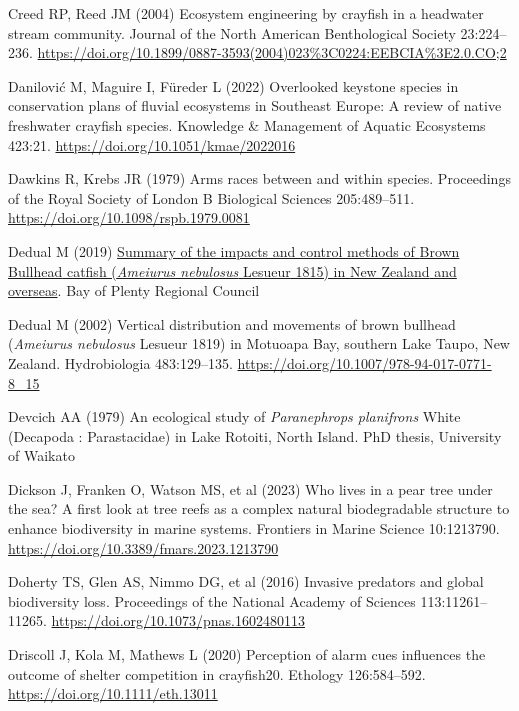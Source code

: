 \documentclass[
  12pt,
  a4paper,
  oneside]{scrbook}
\newlength{\cslhangindent}
\newenvironment{CSLReferences}[2] %
 {\begin{list}{}{%
  \setlength{\itemindent}{0pt}
  \setlength{\leftmargin}{0pt}
  \setlength{\parsep}{0pt}
  \ifodd #1
   \setlength{\leftmargin}{\cslhangindent}
   \setlength{\itemindent}{-1\cslhangindent}
  \fi
  \setlength{\itemsep}{#2\baselineskip}}}
 {\end{list}}
\begin{document}
\begin{CSLReferences}{1}{1}
Creed RP, Reed JM (2004) Ecosystem engineering by crayfish in a
headwater stream community. Journal of the North American Benthological
Society 23:224--236.
\url{https://doi.org/10.1899/0887-3593(2004)023\%3C0224:EEBCIA\%3E2.0.CO;2}

Danilović M, Maguire I, Füreder L (2022) Overlooked keystone species in
conservation plans of fluvial ecosystems in {Southeast Europe}: A review
of native freshwater crayfish species. Knowledge \& Management of
Aquatic Ecosystems 423:21. \url{https://doi.org/10.1051/kmae/2022016}

Dawkins R, Krebs JR (1979) Arms races between and within species.
Proceedings of the Royal Society of London B Biological Sciences
205:489--511. \url{https://doi.org/10.1098/rspb.1979.0081}

Dedual M (2019)
\href{https://atlas.boprc.govt.nz/api/v1/edms/document/A3591759/content}{Summary
of the impacts and control methods of {Brown Bullhead} catfish
({\emph{Ameiurus nebulosus}} {Lesueur} 1815) in {New Zealand} and
overseas}. {Bay of Plenty} Regional Council

Dedual M (2002) Vertical distribution and movements of brown bullhead
({\emph{Ameiurus nebulosus}} {Lesueur} 1819) in {Motuoapa Bay}, southern
{Lake Taupo}, {New Zealand}. Hydrobiologia 483:129--135.
\url{https://doi.org/10.1007/978-94-017-0771-8_15}

Devcich AA (1979) An ecological study of {\emph{Paranephrops
planifrons}} {White} ({Decapoda} : {Parastacidae}) in {Lake Rotoiti},
{North Island}. PhD thesis, University of Waikato

Dickson J, Franken O, Watson MS, et al (2023) Who lives in a pear tree
under the sea? A first look at tree reefs as a complex natural
biodegradable structure to enhance biodiversity in marine systems.
Frontiers in Marine Science 10:1213790.
\url{https://doi.org/10.3389/fmars.2023.1213790}

Doherty TS, Glen AS, Nimmo DG, et al (2016) Invasive predators and
global biodiversity loss. Proceedings of the National Academy of
Sciences 113:11261--11265. \url{https://doi.org/10.1073/pnas.1602480113}

Driscoll J, Kola M, Mathews L (2020) Perception of alarm cues influences
the outcome of shelter competition in crayfish20. Ethology 126:584--592.
\url{https://doi.org/10.1111/eth.13011}


\end{CSLReferences}
\end{document}
